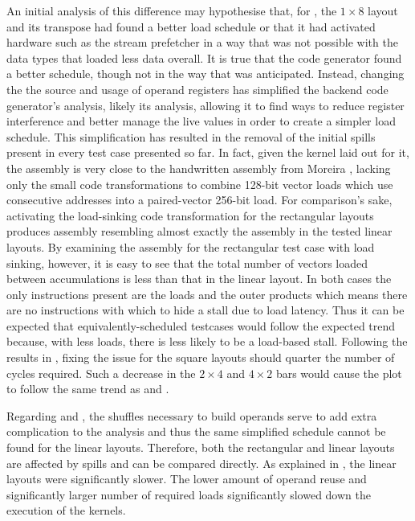 \documentclass[\main/thesis.tex]{subfiles}
\begin{document}
An initial analysis of this difference may hypothesise that, for , the $1 \times 8$ layout and its transpose had found a better load schedule or that it had activated hardware such as the stream prefetcher in a way that was not possible with the data types that loaded less data overall.
It is true that the code generator found a better schedule, though not in the way that was anticipated.
Instead, changing the the source and usage of operand registers has simplified the backend code generator's analysis, likely its  analysis, allowing it to find ways to reduce register interference and better manage the \gls{live} values in order to create a simpler load schedule.
This simplification has resulted in the removal of the initial \glspl{spill} present in every test case presented so far.
In fact, given the kernel laid out for it, the assembly is very close to the handwritten assembly from Moreira \etal, lacking only the small code transformations to combine 128-bit vector loads which use consecutive addresses into a paired-vector 256-bit load.
For comparison's sake, activating the load-sinking code transformation for the rectangular layouts produces assembly resembling almost exactly the assembly in the tested linear layouts.\footnotemark
{}
By examining the assembly for the rectangular test case with load sinking, however, it is easy to see that the total number of vectors loaded between accumulations is less than that in the linear layout.
In both cases the only instructions present are the loads and the outer products which means there are no instructions with which to hide a stall due to load latency.
Thus it can be expected that equivalently-scheduled  testcases would follow the expected trend because, with less loads, there is less likely to be a load-based stall.
Following the results in , fixing the  issue for the  square layouts should quarter the number of cycles required.
Such a decrease in the $2 \times 4$ and $4 \times 2$ bars would cause the  plot to follow the same trend as  and .

Regarding  and , the shuffles necessary to build operands serve to add extra complication to the  analysis and thus the same simplified schedule cannot be found for the linear layouts.
Therefore, both the rectangular and linear layouts are affected by \glspl{spill} and can be compared directly.
As explained in , the linear layouts were significantly slower.
The lower amount of operand reuse and significantly larger number of required loads significantly slowed down the execution of the kernels.
\end{document}
